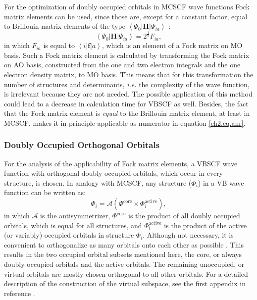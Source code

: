 For the optimization of doubly occupied orbitals in MCSCF wave functions Fock matrix elements can be used, since those are, except for a constant factor, equal to Brillouin matrix elements of the type $\left < \Psi_0 | \mathbf{H} | \Psi_{ia} \right >$ \cite{roos1,roos2}:
\begin{equation}
\left < \Psi_0 | \mathbf{H} | \Psi_{ia} \right > = 2^{\frac{1}{2}}F_{ia},
\label{ch2.eq.mcscffock}
\end{equation}
in which $F_{ia}$ is equal to $\left < i | \mathbf{f} | a \right > $, which is an element of a Fock matrix on MO basis. Such a Fock matrix element is calculated by transforming the Fock matrix on AO basis, constructed from the one and two electron integrals and the one electron density matrix, to MO basis. This means that for this transformation the number of structures and determinants, \textit{i.e.} the complexity of the wave function, is irrelevant because they are not needed. The possible application of this method could lead to a decrease in calculation time for VBSCF as well. Besides, the fact that the Fock matrix element is \textit{equal} to the Brillouin matrix element, at least in MCSCF, makes it in principle applicable as numerator in equation \ref{ch2.eq.anr}.  

\subsubsection{Doubly Occupied Orthogonal Orbitals}

For the analysis of the applicability of Fock matrix elements, a VBSCF wave function with orthogonal doubly occupied orbitals, which occur in every structure, is chosen. In analogy with MCSCF, any structure ($\Phi_i$) in a VB wave function can be written as:
\begin{equation}
\Phi_i = \mathcal{A}(\Phi^{\mathrm{core}} \times \Phi_i^{\mathrm{active}}),
\label{ch2.eq.wfsplit}
\end{equation}
in which $\mathcal{A}$ is the antisymmetrizer, $\Phi^{\mathrm{core}}$ is the product of all doubly occupied orbitals, which is equal for all structures, and $\Phi_i^{\mathrm{active}}$ is the product of the active (or variably) occupied orbitals in structure $\Phi_i$. Although not necessary, it is convenient to orthogonalize as many orbitals onto each other as possible \cite{vbscf2}. This results in the two occupied orbital subsets mentioned here, the core, or always doubly occupied orbitals and the active orbitals. The remaining unoccupied, or virtual orbitals are mostly chosen orthogonal to all other orbitals. For a detailed description of the construction of the virtual subspace, see the first appendix in reference \cite{koos1}.

